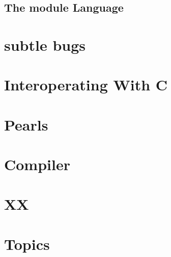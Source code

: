 \documentclass[svgnames,12pt,a4paper]{book}
\begin{document}
\section{The module Language}
\label{sec:module-language}

\chapter{subtle bugs}
\label{sec:subtle-bugs}





\chapter{Interoperating With C}
\label{sec:inter-with-c}


\chapter{Pearls}



\chapter{Compiler}







\chapter{XX}


\chapter{Topics}




\end{document}

